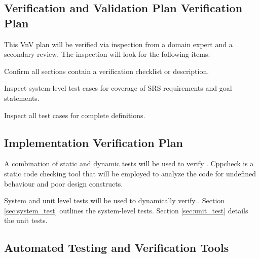 \documentclass[12pt, titlepage]{article}
\begin{document}

\subsection{Verification and Validation Plan Verification Plan}

This VnV plan will be verified via inspection from a domain expert and a secondary review. The
inspection will look for the following items:
\begin{todolist}
    \item Confirm all sections contain a verification checklist or description.
    \item Inspect system-level test cases for coverage of SRS requirements and goal statements.
    \item Inspect all test cases for complete definitions.
\end{todolist}


\subsection{Implementation Verification Plan}

A combination of static and dynamic tests will be used to verify \progname{}. Cppcheck
\citep{cppcheck} is a static code checking tool that will be employed to analyze the code for
undefined behaviour and poor design constructs.

System and unit level tests will be used to dynamically verify \progname{}. Section
\ref{sec:system_test} outlines the system-level tests. Section \ref{sec:unit_test} details the unit
tests.


\subsection{Automated Testing and Verification Tools}
\end{document}

